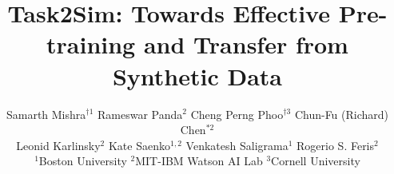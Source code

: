 \documentclass[10pt,twocolumn,letterpaper]{article}
\begin{document}
\title{Task2Sim: Towards Effective Pre-training and Transfer from Synthetic Data}

\author{Samarth Mishra$^{\dagger1}$ \quad Rameswar Panda$^{2}$ \quad Cheng Perng Phoo$^{\dagger3}$ \quad Chun-Fu (Richard) Chen$^{*2}$ \\
\quad Leonid Karlinsky$^2$ \quad
Kate Saenko$^{1,2}$ \qquad Venkatesh Saligrama$^1$ \qquad Rogerio S. Feris$^{2}$ \\
$^1$Boston University \quad $^2$MIT-IBM Watson AI Lab \quad $^3$Cornell University 
}

\maketitle




\vspace{-4mm}








{\small


}


\end{document}

